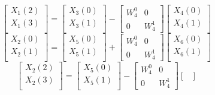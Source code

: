 \documentclass[journal,12pt,twocolumn]{IEEEtran}
\renewcommand\thesection{\arabic{section}}
\begin{document}
\begin{enumerate}[label=\arabic*.,ref=\thesection.\theenumi]
\begin{equation}
	\begin{bmatrix}
		X_{1}(2) \\ 
		X_{1}(3)\\ 
	\end{bmatrix}
	=
	\begin{bmatrix}
		X_{3}(0) \\ 
		X_{3}(1)\\ 
	\end{bmatrix}
	-
	\begin{bmatrix}
		W^{0}_{4} & 0\\
		0 & W^{1}_{4}
	\end{bmatrix}
	\begin{bmatrix}
		X_{4}(0) \\ 
		X_{4}(1) \\ 
	\end{bmatrix}
\end{equation}
\begin{equation}
	\begin{bmatrix}
		X_{2}(0) \\ 
		X_{2}(1)\\ 
	\end{bmatrix}
	=
	\begin{bmatrix}
		X_{5}(0) \\ 
		X_{5}(1)\\ 
	\end{bmatrix}
	+
	\begin{bmatrix}
		W^{0}_{4} & 0\\
		0 & W^{1}_{4}
	\end{bmatrix}
	\begin{bmatrix}
		X_{6}(0) \\ 
		X_{6}(1) \\ 
	\end{bmatrix}
\end{equation}
\begin{equation}
	\begin{bmatrix}
		X_{2}(2) \\ 
		X_{2}(3)\\ 
	\end{bmatrix}
	=
	\begin{bmatrix}
		X_{5}(0) \\ 
		X_{5}(1)\\ 
	\end{bmatrix}
	-
	\begin{bmatrix}
		W^{0}_{4} & 0\\
		0 & W^{1}_{4}
	\end{bmatrix}
	\begin{bmatrix}

\end{bmatrix}
\end{equation}
\end{enumerate}
\end{document}
